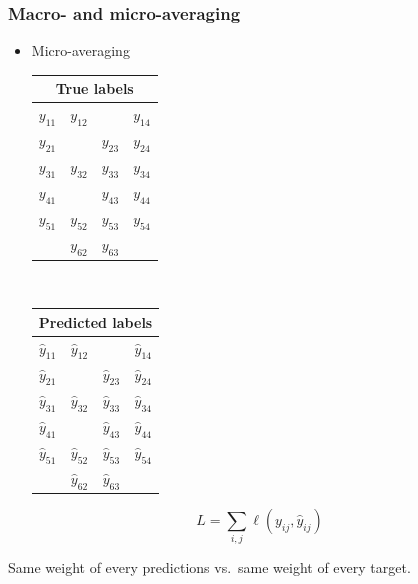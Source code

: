 \documentclass[]{beamer}
\begin{document}
\begin{frame}
\frametitle{Macro- and micro-averaging}

\begin{itemize}
\item<1-> Micro-averaging

\begin{center}
\begin{tabular}{|c|c|c|c|}
\multicolumn{4}{c}{True labels} \\
\hline
\color{putred}$y_{11}$ & \color{putred}$y_{12}$ &   & \color{putred}$y_{14}$ \\
\color{putred}$y_{21}$ &   & \color{putred}$y_{23}$ & \color{putred}$y_{24}$ \\
\color{putred}$y_{31}$ & \color{putred}$y_{32}$ & \color{putred}$y_{33}$ & \color{putred}$y_{34}$ \\
\color{putred}$y_{41}$ &   & \color{putred}$y_{43}$ & \color{putred}$y_{44}$ \\
\color{putred}$y_{51}$ & \color{putred}$y_{52}$ & \color{putred}$y_{53}$ & \color{putred}$y_{54}$ \\
  & \color{putred}$y_{62}$ & \color{putred}$y_{63}$ &   \\
\hline
\end{tabular}
$\quad$
\begin{tabular}{|c|c|c|c|}
\multicolumn{4}{c}{Predicted labels} \\
\hline
\color{putred}$\hat{y}_{11}$ & \color{putred}$\hat{y}_{12}$ &   & \color{putred}$\hat{y}_{14}$ \\
\color{putred}$\hat{y}_{21}$ &   & \color{putred}$\hat{y}_{23}$ & \color{putred}$\hat{y}_{24}$ \\
\color{putred}$\hat{y}_{31}$ & \color{putred}$\hat{y}_{32}$ & \color{putred}$\hat{y}_{33}$ & \color{putred}$\hat{y}_{34}$ \\
\color{putred}$\hat{y}_{41}$ &   & \color{putred}$\hat{y}_{43}$ & \color{putred}$\hat{y}_{44}$ \\
\color{putred}$\hat{y}_{51}$ & \color{putred}$\hat{y}_{52}$ & \color{putred}$\hat{y}_{53}$ & \color{putred}$\hat{y}_{54}$ \\
  & \color{putred}$\hat{y}_{62}$ & \color{putred}$\hat{y}_{63}$ &   \\
\hline
\end{tabular}
\end{center}
\end{itemize}

$$
L =  \sum_{i,j} \ell(y_{ij} , \hat{y}_{ij})
$$
\begin{center}
Same weight of every predictions vs.\ same weight of every target.
\end{center}

\end{frame}
\end{document}
